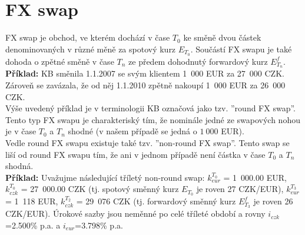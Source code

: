 \documentclass[a4paper]{article}
\begin{document}
\section{FX swap}

FX swap je obchod, ve kterém dochází v čase $T_0$ ke směně dvou částek denominovaných v různé měně za spotový kurz $E_{T_0}$. Součástí FX swapu je také dohoda o zpětné směně v čase $T_n$ ze předem dohodnutý forwardový kurz $E^f_{T_n}$.\\

\noindent \textbf{Příklad:} KB směnila 1.1.2007 se svým klientem 1~000 EUR za 27~000 CZK. Zároveň se zavázala, že od něj 1.1.2010 zpětně nakoupí 1~000 EUR za 26~000 CZK.\\

Výše uvedený příklad je v terminologii KB označová jako tzv. ''round FX swap''. Tento typ FX swapu je charakteriský tím, že nominále jedné ze swapových nohou je v čase $T_0$ a $T_n$ shodné (v našem případě se jedná o $1~000$ EUR).\\

Vedle round FX swapu existuje také tzv. ''non-round FX swap''. Tento swap se liší od round FX swapu tím, že ani v jednom případě není částka v čase $T_0$ a $T_n$ shodná.\\

\noindent \textbf{Příklad:} Uvažujme následující tříletý non-round swap: $k_{eur}^{T_0}$ = 1~000.00 EUR, $k_{czk}^{T_0}$ = 27~000.00 CZK (tj. spotový směnný kurz $E_{T_0}$ je roven 27 CZK/EUR), $k_{eur}^{T_3}$= 1~118 EUR, $k_{czk}^{T_2}$ = 29~076 CZK (tj. forwardový směnný kurz $E^f_{T_3}$ je roven 26 CZK/EUR). Úrokové sazby jsou neměnné po celé tříleté období a rovny $i_{czk}$=2.500\% p.a. a $i_{eur}$=3.798\% p.a.
\end{document}
